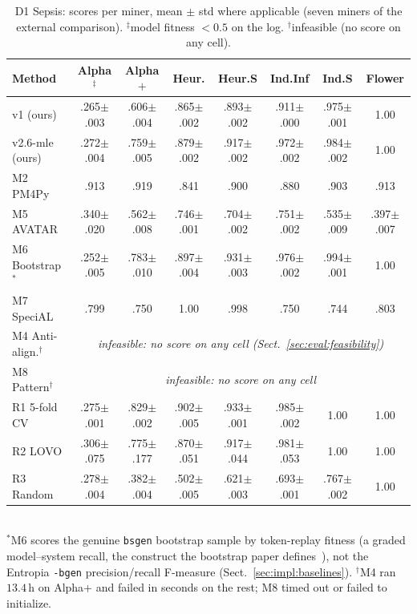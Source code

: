 \documentclass[runningheads]{llncs}
\begin{document}
\begin{table}[t]
\centering
\caption{D1 Sepsis: scores per miner, mean $\pm$ std where applicable (seven miners of the external comparison). $^{\ddagger}$model fitness $<0.5$ on the log. $^{\dagger}$infeasible (no score on any cell).}
\label{tab:external}
\setlength{\tabcolsep}{1.6pt}
\scriptsize
\begin{tabular}{@{}lccccccc@{}}
\toprule
Method & Alpha$^{\ddagger}$ & Alpha$+$ & Heur. & Heur.S & Ind.Inf & Ind.S & Flower \\
\midrule
v1 (ours) & .265$\pm$.003 & .606$\pm$.004 & .865$\pm$.002 & .893$\pm$.002 & .911$\pm$.000 & .975$\pm$.001 & 1.00 \\
v2.6-mle (ours) & .272$\pm$.004 & .759$\pm$.005 & .879$\pm$.002 & .917$\pm$.002 & .972$\pm$.002 & .984$\pm$.002 & 1.00 \\
M2 PM4Py & .913 & .919 & .841 & .900 & .880 & .903 & .913 \\
M5 AVATAR & .340$\pm$.020 & .562$\pm$.008 & .746$\pm$.001 & .704$\pm$.002 & .751$\pm$.002 & .535$\pm$.009 & .397$\pm$.007 \\
M6 Bootstrap$^{*}$ & .252$\pm$.005 & .783$\pm$.010 & .897$\pm$.004 & .931$\pm$.003 & .976$\pm$.002 & .994$\pm$.001 & 1.00 \\
M7 SpeciAL & .799 & .750 & 1.00 & .998 & .750 & .744 & .803 \\
M4 Anti-align.$^{\dagger}$ & \multicolumn{7}{c}{\emph{infeasible: no score on any cell (Sect.~\ref{sec:eval:feasibility})}} \\
M8 Pattern$^{\dagger}$ & \multicolumn{7}{c}{\emph{infeasible: no score on any cell}} \\
\midrule
R1 5-fold CV & .275$\pm$.001 & .829$\pm$.002 & .902$\pm$.005 & .933$\pm$.001 & .985$\pm$.002 & 1.00 & 1.00 \\
R2 LOVO & .306$\pm$.075 & .775$\pm$.177 & .870$\pm$.051 & .917$\pm$.044 & .981$\pm$.053 & 1.00 & 1.00 \\
R3 Random & .278$\pm$.004 & .382$\pm$.004 & .502$\pm$.005 & .621$\pm$.003 & .693$\pm$.001 & .767$\pm$.002 & 1.00 \\
\bottomrule
\end{tabular}\\[2pt]
{\scriptsize $^{*}$M6 scores the genuine \texttt{bsgen} bootstrap sample by token-replay fitness (a graded model--system recall, the construct the bootstrap paper defines~\cite{polyvyanyy2022bootstrap}), not the Entropia \texttt{-bgen} precision/recall F-measure (Sect.~\ref{sec:impl:baselines}). $^{\dagger}$M4 ran $13.4$\,h on Alpha+ and failed in seconds on the rest; M8 timed out or failed to initialize.}
\end{table}
\end{document}
